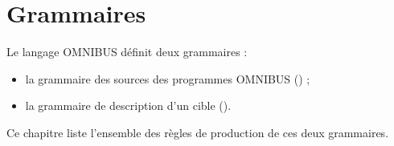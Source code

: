 




\chapter{Grammaires}

Le langage OMNIBUS définit deux grammaires :
\begin{itemize}
\item la grammaire des sources des programmes OMNIBUS () ;
\item la grammaire de description d'un cible ().
\end{itemize}

Ce chapitre liste l'ensemble des règles de production de ces deux grammaires.


